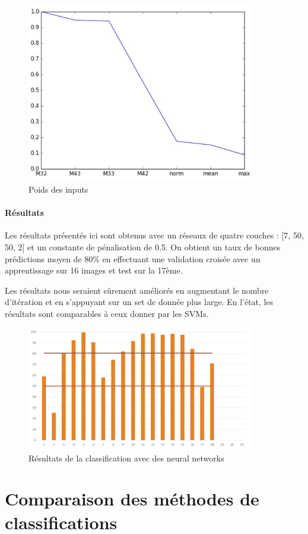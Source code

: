 \documentclass[a4paper,10pt]{report}
\begin{document}
\begin{figure}[htbp]
  \caption{Poids des inputs}
  \centering
  \includegraphics[width=10cm]{input_weight_nn.png}
\end{figure}

\paragraph{Résultats}
Les résultats présentés ici sont obtenus avec un réseaux de quatre couches : [7, 50, 50, 2] et un constante de pénalisation de 0.5.
On obtient un taux de bonnes prédictions moyen de 80\% en effectuant une validation croisée avec un apprentissage sur 16 images et test sur la 17ème. 

Les résultats nous seraient sûrement améliorés en augmentant le nombre d'itération et en s'appuyant sur un set de donnée plus large. En l'état, les résultats sont comparables à ceux donner par les SVMs.
\begin{figure}[htbp]
  \caption{Résultats de la classification avec des neural networks}
  \centering
  \includegraphics[width=10cm]{nn_results.png}
\end{figure}

\section{Comparaison des méthodes de classifications}
\end{document}
